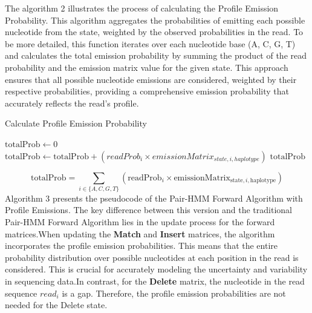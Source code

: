 \documentclass[PhD]{PHlab-thesis}
\begin{document}
The algorithm 2 illustrates the process of calculating the Profile Emission Probability. This algorithm aggregates the probabilities of emitting each possible nucleotide from the state, weighted by the observed probabilities in the read. To be more detailed, this function iterates over each nucleotide base (A, C, G, T) and calculates the total emission probability by summing the product of the read probability and the emission matrix value for the given state. This approach ensures that all possible nucleotide emissions are considered, weighted by their respective probabilities, providing a comprehensive emission probability that accurately reflects the read's profile.
\vspace{0.5cm} %
\begin{algorithm}
\caption{Calculate Profile Emission Probability}
\begin{algorithmic}[1]
    \State $\text{totalProb} \gets 0$ 
            \State $\text{totalProb} \gets \text{totalProb} + (readProb_{i} \times emissionMatrix_{state,i,haplotype})$ 
    \EndFor
    \State \Return $\text{totalProb}$ 
\EndFunction
\end{algorithmic}
\end{algorithm}
\vspace{0.5cm} %
\[
\text{totalProb} = \sum_{i \in \{A,C,G,T\}} (\text{readProb}_i \times \text{emissionMatrix}_{\text{state},i,\text{haplotype}})
\]
\newpage
Algorithm 3 presents the pseudocode of the Pair-HMM Forward Algorithm with Profile Emissions. The key difference between this version and the traditional Pair-HMM Forward Algorithm lies in the update process for the forward matrices.When updating the \textbf{Match} and \textbf{Insert} matrices, the algorithm incorporates the profile emission probabilities. This means that the entire probability distribution over possible nucleotides at each position in the read is considered. This is crucial for accurately modeling the uncertainty and variability in sequencing data.In contrast, for the \textbf{Delete} matrix, the nucleotide in the read sequence $read_{i}$ is a gap. Therefore, the profile emission probabilities are not needed for the Delete state.
\vspace{0.5cm} %
\end{document}
